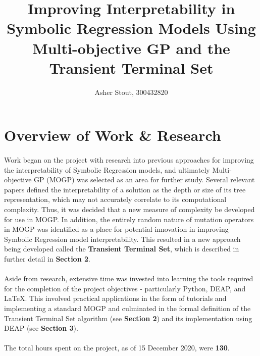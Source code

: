 \documentclass[a4paper]{article}
\title{Improving Interpretability in Symbolic Regression Models Using Multi-objective GP and the Transient Terminal Set}
\author{Asher Stout, 300432820}
\begin{document}
\maketitle

\section{Overview of Work \& Research}
\paragraph{} Work began on the project with research into previous approaches for improving the interpretability of Symbolic Regression models, and ultimately Multi-objective GP (MOGP) was selected as an area for further study. Several relevant papers defined the interpretability of a solution as the depth or size of its tree representation, which may not accurately correlate to its computational complexity. Thus, it was decided that a new measure of complexity be developed for use in MOGP. In addition, the entirely random nature of mutation operators in MOGP was identified as a place for potential innovation in improving Symbolic Regression model interpretability. This resulted in a new approach being developed called the \textbf{Transient Terminal Set}, which is described in further detail in \textbf{Section 2}.
\paragraph{} Aside from research, extensive time was invested into learning the tools required for the completion of the project objectives - particularly Python, DEAP, and LaTeX. This involved practical applications in the form of tutorials and implementing a standard MOGP and culminated in the formal definition of the Transient Terminal Set algorithm (see \textbf{Section 2}) and its implementation using DEAP (see \textbf{Section 3}). 
\paragraph{}The total hours spent on the project, as of 15 December 2020, were \textbf{130}.

\end{document}
